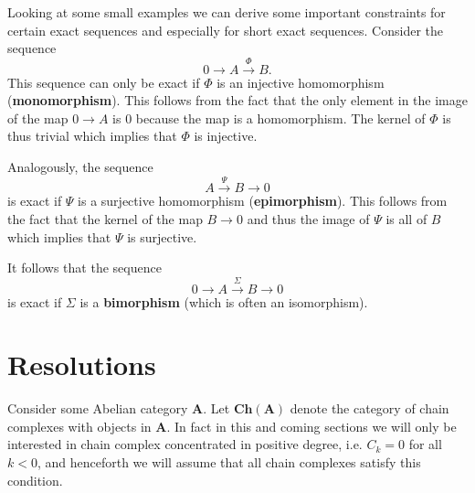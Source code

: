 
	\begin{property}
		Looking at some small examples we can derive some important constraints for certain exact sequences and especially for short exact sequences. Consider the sequence \[0\rightarrow A\xrightarrow{\Phi} B.\] This sequence can only be exact if $\Phi$ is an injective homomorphism (\textbf{monomorphism}). This follows from the fact that the only element in the image of the map $0\rightarrow A$ is 0 because the map is a homomorphism. The kernel of $\Phi$ is thus trivial which implies that $\Phi$ is injective.

		Analogously, the sequence \[A\xrightarrow{\Psi}B\rightarrow0\] is exact if $\Psi$ is a surjective homomorphism (\textbf{epimorphism}). This follows from the fact that the kernel of the map $B\rightarrow0$ and thus the image of $\Psi$ is all of $B$ which implies that $\Psi$ is surjective.

		It follows that the sequence \[0\longrightarrow A\xrightarrow{\Sigma}B\longrightarrow0\] is exact if $\Sigma$ is a \textbf{bimorphism} (which is often an isomorphism).
	\end{property}

\section{Resolutions}

	Consider some Abelian category $\textbf{A}$. Let $\textbf{Ch}(\textbf{A})$ denote the category of chain complexes with objects in $\textbf{A}$. In fact in this and coming sections we will only be interested in chain complex concentrated in positive degree, i.e. $C_k=0$ for all $k<0$, and henceforth we will assume that all chain complexes satisfy this condition.


